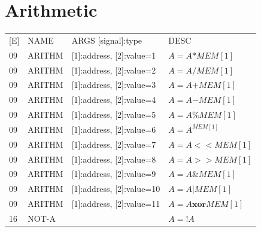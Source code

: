 \documentclass{scrreprt}
\begin{document}
    \section{Arithmetic}
        \begin{tabular}{l | l | l  l}
    	[E] & NAME & ARGS [signal]:type & DESC \\
    	09 & ARITHM & [1]:address, [2]:value=1 & $A = A \mathbf{*} MEM[1]$\\  
    	09 & ARITHM & [1]:address, [2]:value=2 & $A = A \mathbf{/} MEM[1]$\\  
    	09 & ARITHM & [1]:address, [2]:value=3 & $A = A \mathbf{+} MEM[1]$\\  
    	09 & ARITHM & [1]:address, [2]:value=4 & $A = A \mathbf{-} MEM[1]$\\  
    	09 & ARITHM & [1]:address, [2]:value=5 & $A = A \mathbf{\%} MEM[1]$\\  
    	09 & ARITHM & [1]:address, [2]:value=6 & $A = A^{MEM[1]}$\\  
    	09 & ARITHM & [1]:address, [2]:value=7 & $A = A \mathbf{<<} MEM[1]$\\  
    	09 & ARITHM & [1]:address, [2]:value=8 & $A = A \mathbf{>>} MEM[1]$\\  
    	09 & ARITHM & [1]:address, [2]:value=9 & $A = A \mathbf{\&} MEM[1]$\\  
    	09 & ARITHM & [1]:address, [2]:value=10 & $A = A \mathbf{|} MEM[1]$\\  
    	09 & ARITHM & [1]:address, [2]:value=11 & $A = A \mathbf{xor} MEM[1]$\\  
    	16 & NOT-A & & $A = !A$\\ 
    \end{tabular}
    
\end{document}
